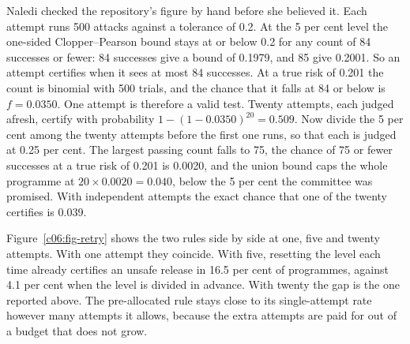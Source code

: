 \begin{example}\label{c06:ex-twenty}
Naledi checked the repository's figure by hand before she believed it. Each attempt runs
500 attacks against a tolerance of 0.2. At the 5 per cent level the one-sided
Clopper--Pearson bound \citep{clopper1934} stays at or below 0.2 for any count of 84
successes or fewer: 84 successes give a bound of 0.1979, and 85 give 0.2001. So an
attempt certifies when it sees at most 84 successes. At a true risk of 0.201 the count is
binomial with 500 trials, and the chance that it falls at 84 or below is $f = 0.0350$.
One attempt is therefore a valid test. Twenty attempts, each judged afresh, certify with
probability $1 - (1 - 0.0350)^{20} = 0.509$. Now divide the 5 per cent among the twenty
attempts before the first one runs, so that each is judged at 0.25 per cent. The largest
passing count falls to 75, the chance of 75 or fewer successes at a true risk of 0.201
is 0.0020, and the union bound caps the whole programme at $20 \times 0.0020 = 0.040$,
below the 5 per cent the committee was promised. With independent attempts the exact
chance that one of the twenty certifies is 0.039.
\end{example}


Figure~\ref{c06:fig-retry} shows the two rules side by side at one, five and twenty
attempts. With one attempt they coincide. With five, resetting the level each time
already certifies an unsafe release in 16.5 per cent of programmes, against 4.1
per cent when the level is divided in advance. With twenty the gap is the one
reported above. The pre-allocated rule stays close to its single-attempt rate
however many attempts it allows, because the extra attempts are paid for out of a
budget that does not grow.

